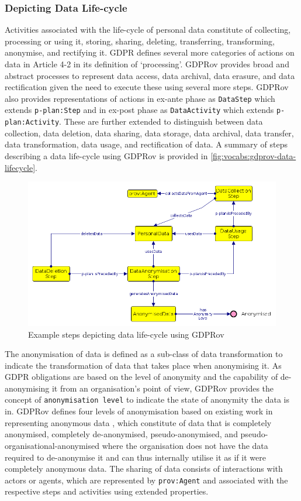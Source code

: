 \subsubsection{Depicting Data Life-cycle}
Activities associated with the life-cycle of personal data constitute of collecting, processing or using it, storing, sharing, deleting, transferring, transforming, anonymise, and rectifying it. GDPR defines several more categories of actions on data in Article 4-2 in its definition of `processing'.
GDPRov provides broad and abstract processes to represent data access, data archival, data erasure, and data rectification given the need to execute these using several more steps.
GDPRov also provides representations of actions in ex-ante phase as \texttt{DataStep} which extends \texttt{p-plan:Step} and in ex-post phase as \texttt{DataActivity} which extends \texttt{p-plan:Activity}.
These are further extended to distinguish between data collection, data deletion, data sharing, data storage, data archival, data transfer, data transformation, data usage, and rectification of data.
A summary of steps describing a data life-cycle using GDPRov is provided in \autoref{fig:vocabs:gdprov-data-lifecycle}.
\begin{figure}[htbp]
    \centering
    \includegraphics[width=\linewidth]{img/GDPRov_data_lifecycle.png}
    \caption{Example steps depicting data life-cycle using GDPRov}
    \label{fig:vocabs:gdprov-data-lifecycle}
\end{figure}

The anonymisation of data is defined as a sub-class of data transformation to indicate the transformation of data that takes place when anonymising it.
As GDPR obligations are based on the level of anonymity and the capability of de-anonymising it from an organisation's point of view, GDPRov provides the concept of \texttt{anonymisation level} to indicate the state of anonymity the data is in.
GDPRov defines four levels of anonymisation based on existing work in representing anonymous data \cite{hintze_meeting_2017}, which constitute of data that is completely anonymised, completely de-anonymised, pseudo-anonymised, and pseudo-organisational-anonymised where the organisation does not have the data required to de-anonymise it and can thus internally utilise it as if it were completely anonymous data.
The sharing of data consists of interactions with actors or agents, which are represented by \texttt{prov:Agent} and associated with the respective steps and activities using extended properties.

